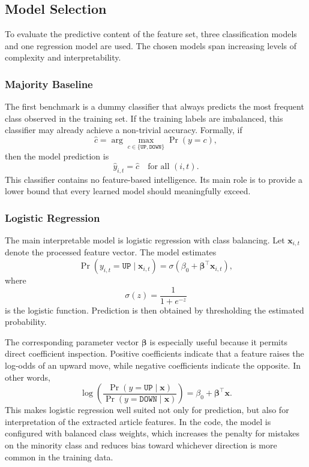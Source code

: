 \subsection{Model Selection}

To evaluate the predictive content of the feature set, three classification models and one regression model are used. The chosen models span increasing levels of complexity and interpretability.

\subsubsection{Majority Baseline}

The first benchmark is a dummy classifier that always predicts the most frequent class observed in the training set. If the training labels are imbalanced, this classifier may already achieve a non-trivial accuracy. Formally, if
\[
\hat{c} = \arg\max_{c \in \{\texttt{UP}, \texttt{DOWN}\}} \Pr(y=c),
\]
then the model prediction is
\[
\hat{y}_{i,t} = \hat{c}
\quad \text{for all } (i,t).
\]
This classifier contains no feature-based intelligence. Its main role is to provide a lower bound that every learned model should meaningfully exceed.

\subsubsection{Logistic Regression}

The main interpretable model is logistic regression with class balancing. Let $\mathbf{x}_{i,t}$ denote the processed feature vector. The model estimates
\[
\Pr(y_{i,t}=\texttt{UP}\mid \mathbf{x}_{i,t})
=
\sigma(\beta_0 + \boldsymbol{\beta}^{\top}\mathbf{x}_{i,t}),
\]
where
\[
\sigma(z)=\frac{1}{1+e^{-z}}
\]
is the logistic function. Prediction is then obtained by thresholding the estimated probability.

The corresponding parameter vector $\boldsymbol{\beta}$ is especially useful because it permits direct coefficient inspection. Positive coefficients indicate that a feature raises the log-odds of an upward move, while negative coefficients indicate the opposite. In other words,
\[
\log\left(\frac{\Pr(y=\texttt{UP}\mid \mathbf{x})}{\Pr(y=\texttt{DOWN}\mid \mathbf{x})}\right)
=
\beta_0 + \boldsymbol{\beta}^{\top}\mathbf{x}.
\]
This makes logistic regression well suited not only for prediction, but also for interpretation of the extracted article features. In the code, the model is configured with balanced class weights, which increases the penalty for mistakes on the minority class and reduces bias toward whichever direction is more common in the training data.

